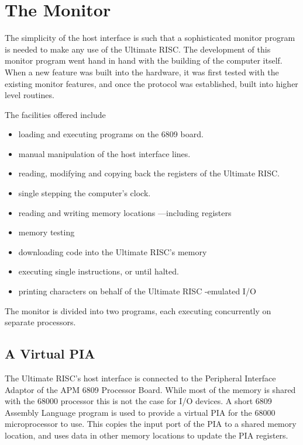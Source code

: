 \section{The Monitor}

The simplicity of the host interface is such that a sophisticated monitor 
program is needed to make any use of the Ultimate RISC.
The development of this monitor program went hand in hand with the building 
of the computer itself.
When a new feature was built into the hardware, it was first tested with the
existing monitor features, and once the protocol was established, built 
into higher level routines.

The facilities offered include
\begin{itemize}
\item loading and executing programs on the 6809 board.
\item manual manipulation of the host interface lines.
\item reading, modifying and copying back the registers of the Ultimate RISC.
\item single stepping the computer's clock.
\item reading and writing memory locations ---including registers
\item memory testing
\item downloading code into the Ultimate RISC's memory
\item executing single instructions, or until halted.
\item printing characters on behalf of the Ultimate RISC -emulated I/O
\end{itemize}

The monitor is divided into two programs, each executing 
concurrently on separate processors.

\subsection{A Virtual PIA}
The Ultimate RISC's host interface is  connected to the Peripheral Interface
Adaptor of the APM 6809 Processor Board. While most of the memory is shared 
with the 68000 processor this is not the case for I/O devices.
A short 6809 Assembly Language program is used to provide a virtual PIA for 
the 68000 microprocessor to use. 
This copies the input port of 
the PIA to a shared memory location, and uses data in other
 memory locations to update the PIA registers.

